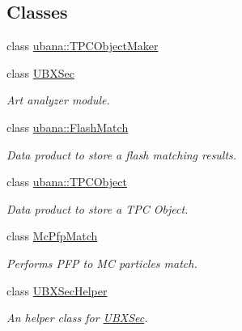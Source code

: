 \subsection*{Classes}
\begin{DoxyCompactItemize}
\item 
class \hyperlink{classubana_1_1TPCObjectMaker}{ubana\-::\-T\-P\-C\-Object\-Maker}
\item 
class \hyperlink{classUBXSec}{U\-B\-X\-Sec}
\begin{DoxyCompactList}\small\item\em Art analyzer module. \end{DoxyCompactList}\item 
class \hyperlink{classubana_1_1FlashMatch}{ubana\-::\-Flash\-Match}
\begin{DoxyCompactList}\small\item\em Data product to store a flash matching results. \end{DoxyCompactList}\item 
class \hyperlink{classubana_1_1TPCObject}{ubana\-::\-T\-P\-C\-Object}
\begin{DoxyCompactList}\small\item\em Data product to store a T\-P\-C Object. \end{DoxyCompactList}\item 
class \hyperlink{classMcPfpMatch}{Mc\-Pfp\-Match}
\begin{DoxyCompactList}\small\item\em Performs P\-F\-P to M\-C particles match. \end{DoxyCompactList}\item 
class \hyperlink{classUBXSecHelper}{U\-B\-X\-Sec\-Helper}
\begin{DoxyCompactList}\small\item\em An helper class for \hyperlink{classUBXSec}{U\-B\-X\-Sec}. \end{DoxyCompactList}\end{DoxyCompactItemize}
